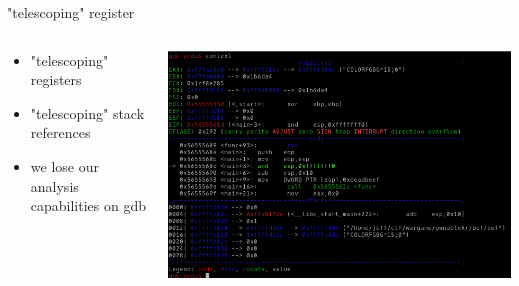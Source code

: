 \documentclass[10pt,pdf,utf8,english,compress,hyperref={unicode}]{beamer}
\begin{document}
\begin{frame}{"telescoping" register}
	\begin{columns}
		\begin{column}{.3\textwidth}
			\begin{itemize}
				\item "telescoping" registers
				\item "telescoping" stack references
				\item we lose our analysis capabilities on gdb
			\end{itemize}
		\end{column}
		\begin{column}{.7\textwidth}
			\includegraphics[width=\textwidth]{cr_images/peda_context.png}
		\end{column}
	\end{columns}
\end{frame}
\end{document}

